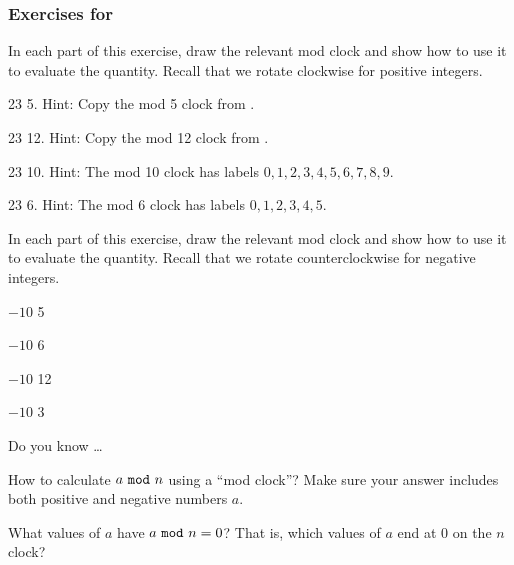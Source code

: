 
\subsubsection*{Exercises for 
\submod}

\begin{exer}[\exerP] %
\label{exer_eval_mod_clock}
    In each part of this exercise, draw the relevant mod clock and show how to use it to evaluate the quantity.  Recall that we rotate clockwise for positive integers.
    \begin{exerpart}
        \item 23  5. Hint: Copy the mod 5 clock from .
        \item 23  12. Hint: Copy the mod 12 clock from .
        \item 23  10. Hint: The mod 10 clock has labels $0,1,2,3,4,5,6,7,8,9$.
        \item 23  6. Hint: The mod 6 clock has labels $0,1,2,3,4,5$.
    \end{exerpart}
\end{exer}

\begin{exer}[\exerU] %
\label{exer_neg_mod_clock}
    In each part of this exercise, draw the relevant mod clock and show how to use it to evaluate the quantity.  Recall that we rotate counterclockwise for negative integers.
    \begin{exerpart}
        \item $-10$  5
        \item $-10$  6
        \item $-10$  12
        \item $-10$  3
    \end{exerpart}
\end{exer}

\begin{exer}[\exerR] %
\label{exer_dyk_mod_clock}
    Do you know \ldots
        \begin{exerpart}
            \item How to calculate $a~\texttt{mod}~n$ using a ``mod clock''? Make sure your answer includes both positive and negative numbers $a$.
            \item What values of $a$ have $a~\texttt{mod}~n=0$?  That is, which values of $a$ end at 0 on the  $n$ clock?
        \end{exerpart}
\end{exer}

